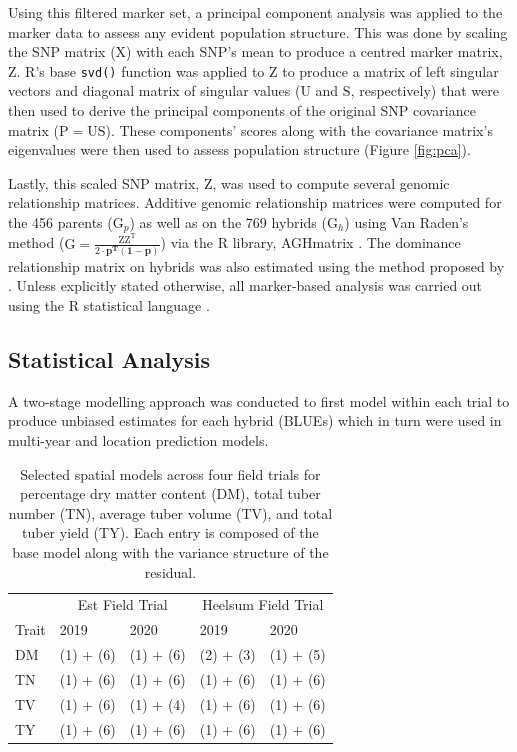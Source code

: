 Using this filtered marker set, a principal component analysis was applied to the marker data to assess any evident population structure. This was done by scaling the SNP matrix (\(\mathrm X\)) with each SNP's mean to produce a centred marker matrix, \(\mathrm Z\). R's base \texttt{svd()} function was applied to \(\mathrm Z\) to produce a matrix of left singular vectors and diagonal matrix of singular values (\(\mathrm U\) and \(\mathrm S\), respectively) that were then used to derive the principal components of the original SNP covariance matrix (\(\mathrm {P = US}\)). These components' scores along with the covariance matrix's eigenvalues were then used to assess population structure (Figure \ref{fig:pca}).

Lastly, this scaled SNP matrix, \(\mathrm Z\), was used to compute several genomic relationship matrices. Additive genomic relationship matrices were computed for the 456 parents (\(\mathrm G_p\)) as well as on the 769 hybrids (\(\mathrm G_h\)) using Van Raden's method (\(\mathrm{G = \frac{ZZ^T}{2\cdot \mathbf{p^T(1-p)}}}\)) \cite{VanRaden2008} via the R library, AGHmatrix \cite{Amadeu2016}. The dominance relationship matrix on hybrids was also estimated using the method proposed by \cite{Su2012}. Unless explicitly stated otherwise, all marker-based analysis was carried out using the R statistical language \cite{R2022}.

\subsection{Statistical Analysis}

A two-stage modelling approach was conducted to first model within each trial to produce unbiased estimates for each hybrid (BLUEs) which in turn were used in multi-year and location prediction models.

\begin{table}[H]
\caption{Selected spatial models across four field trials for percentage dry matter content (DM), total tuber number (TN), average tuber volume (TV), and total tuber yield (TY). Each entry is composed of the base model along with the variance structure of the residual.}
\label{tbl:spatial-model}
\centering
\begin{tabular}{lllll}
\toprule
\multicolumn{1}{c}{} & \multicolumn{2}{c}{Est Field Trial} & \multicolumn{2}{c}{Heelsum Field Trial} \\
\cmidrule(l{3pt}r{3pt}){2-3} \cmidrule(l{3pt}r{3pt}){4-5}
Trait & 2019 & 2020 & 2019 & 2020\\
\midrule
DM & (1) + (6) & (1) + (6) & (2) + (3) & (1) + (5)\\
TN & (1) + (6) & (1) + (6) & (1) + (6) & (1) + (6)\\
TV & (1) + (6) & (1) + (4) & (1) + (6) & (1) + (6)\\
TY & (1) + (6) & (1) + (6) & (1) + (6) & (1) + (6)\\
\bottomrule
\end{tabular}
\end{table}

